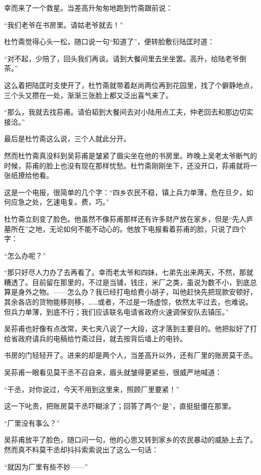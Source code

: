 \par 幸而来了一个救星。当差高升匆匆地跑到竹斋跟前说：
\par “我们老爷在书房里。请姑老爷就去！”
\par 杜竹斋觉得心头一松，随口说一句“知道了”，便转脸敷衍陆匡时道：
\par “对不起，少陪了，回头我们再谈。请到大餐间里去坐坐罢。高升，给陆老爷倒茶。”
\par 这么着把陆匡时支使开了，杜竹斋就带着赵尚两位再到花园里，找了个僻静地点，三个头又攒在一处，渐渐三张脸上都又泛出喜气来了。
\par “那么，我就去找荪甫。请伯韬到大餐间去对小陆用点工夫，仲老回去和那边切实接洽。”
\par 最后是杜竹斋这么说，三个人就此分开。
\par 然而杜竹斋真没料到吴荪甫是皱紧了眉尖坐在他的书房里。昨晚上吴老太爷断气的时候，荪甫的脸上也没有现在那样忧愁。杜竹斋刚刚坐下，还没开口，荪甫就将一张纸撩给他看。
\par 这是一个电报，很简单的几个字：“四乡农民不稳，镇上兵力单薄，危在旦夕，如何应急之处，乞速电复。费，巧。”
\par 杜竹斋立刻变了脸色。他虽然不像荪甫那样还有许多财产放在家乡，但是“先人庐墓所在”之地，无论如何不能不动心的。他放下电报看着荪甫的脸，只说了四个字：
\par “怎么办呢？”
\par “那只好尽人力办了去再看了。幸而老太爷和四妹，七弟先出来两天，不然，那就糟透了。目前留在那里的，不过是当铺，钱庄，米厂之类，虽说为数不小，到底总算是身外之物。——怎么办？我已经打电给费小胡子，叫他赶快先把现款安顿好，其余各店的货物能移则移，……或者，不过是一场虚惊，依然太平过去，也难说。但兵力单薄，到底不行；我们应该联名电请省政府火速调保安队去镇压。”
\par 吴荪甫也好像有点改常，夹七夹八说了一大段，这才落到主要目的。他把拟好了打给省政府请兵的电稿给竹斋过目，就去按背后墙上的电铃。
\par 书房的门轻轻开了。进来的却是两个人，当差高升以外，还有厂里的账房莫干丞。
\par 吴荪甫一眼看见莫干丞不召自来，眉头就皱得更紧些，很威严地喊道：
\par “干丞，对你说过，今天不用到这里来，照顾厂里要紧！”
\par 这一下叱责，把账房莫干丞吓糊涂了；回答了两个“是”，直挺挺僵在那里。
\par “厂里没有事么？”
\par 吴荪甫放平了脸色，随口问一句，他的心思又转到家乡的农民暴动的威胁上去了。然而真不料莫干丞却抖抖索索说出了这么一句话：
\par “就因为厂里有些不妙——”
